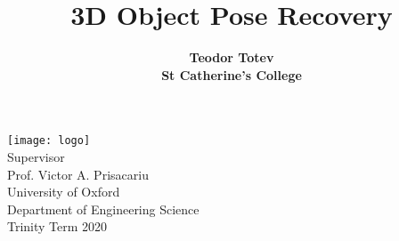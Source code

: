\documentclass[a4paper,11pt]{article}
\title{\textbf{3D Object Pose Recovery}}
\author{\textbf{Teodor Totev} \\ \textbf{St Catherine's College}}
\date{}
\begin{document}
\begin{titlepage}
\clearpage
\maketitle
\thispagestyle{empty}
\vspace{10mm}
\begin{center}
\texttt{[image: logo]} \\
\vspace{30mm}
Supervisor\\
Prof. Victor A. Prisacariu\\
\vspace{30mm}
University of Oxford \\
Department of Engineering Science \\
Trinity Term 2020
\end{center}
\end{titlepage}

\clearpage

\begin{abstract}

\end{abstract}

\clearpage

\renewcommand{\abstractname}{Acknowledgements}
\begin{abstract}
 
\end{abstract}

\clearpage

\tableofcontents

\clearpage



\clearpage



\clearpage



\clearpage



\clearpage 



\clearpage





\clearpage

\printbibliography



\end{document}
